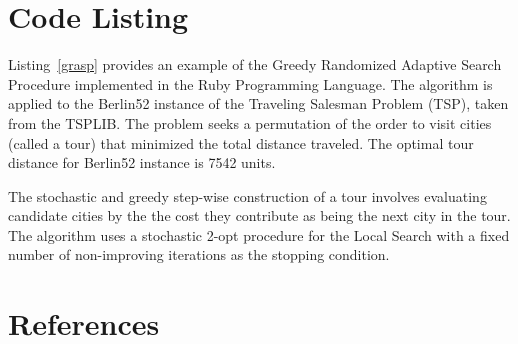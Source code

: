 \documentclass[a4paper, 11pt]{article}
\begin{document}
\section{Code Listing}
\label{sec:code}
Listing~\ref{grasp} provides an example of the Greedy Randomized Adaptive Search Procedure implemented in the Ruby Programming Language. 
The algorithm is applied to the Berlin52 instance of the Traveling Salesman Problem (TSP), taken from the TSPLIB. The problem seeks a permutation of the order to visit cities (called a tour) that minimized the total distance traveled. The optimal tour distance for Berlin52 instance is 7542 units.

The stochastic and greedy step-wise construction of a tour involves evaluating candidate cities by the the cost they contribute as being the next city in the tour. 
The algorithm uses a stochastic 2-opt procedure for the Local Search with a fixed number of non-improving iterations as the stopping condition.




\section{References}
\label{sec:references}
\end{document}
